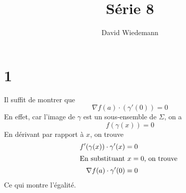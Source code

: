 \documentclass[11pt, a4paper]{article}
\begin{document}
\title{Série 8}
\author{David Wiedemann}
\maketitle
\section*{1}
Il suffit de montrer que 
\[ 
	\nabla f( a)  \cdot ( \gamma'( 0) ) = 0
\]
En effet, car l'image de $\gamma$ est un sous-ensemble de  $\Sigma$, on a
\[ 
	f(\gamma( x)  )  =0
\]
En dérivant par rapport à $x$, on trouve
\begin{align*}
	f'( \gamma( x) ) \cdot \gamma'( x) &=0\\
	\intertext{En substituant $x=0$, on trouve }
	\nabla f( a)  \cdot \gamma'( 0) &= 0
\end{align*}
Ce qui montre l'égalité.
\end{document}
